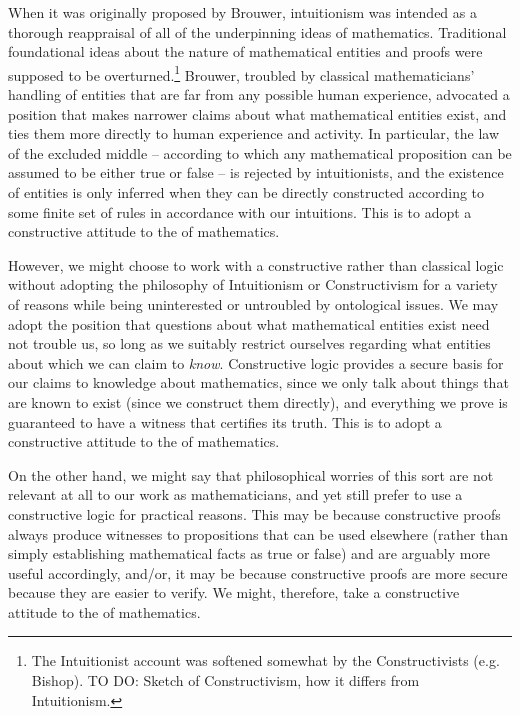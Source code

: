 When it was originally proposed by Brouwer, intuitionism was intended as a thorough reappraisal of all of the underpinning ideas of mathematics. Traditional foundational ideas about the nature of mathematical entities and proofs were supposed to be overturned.\footnote{
The Intuitionist account was softened somewhat by the Constructivists (e.g. Bishop).
TO DO: Sketch of Constructivism, how it differs from Intuitionism.
}
Brouwer, troubled by classical mathematicians' handling of entities that are far from any possible human experience,  advocated a position that makes narrower claims about what mathematical entities exist, and ties them more directly to human experience and activity. In particular, the law of the excluded middle -- according to which any mathematical proposition can be assumed to be either true or false -- is rejected by intuitionists, and the existence of entities is only inferred when they can be directly constructed according to some finite set of rules in accordance with our intuitions. This is to adopt a constructive attitude to the  of mathematics.

However, we might choose to work with a constructive rather than classical logic without adopting the philosophy of Intuitionism or Constructivism for a variety of reasons while being uninterested or untroubled by ontological issues. We may adopt the position that questions about what mathematical entities exist need not trouble us, so long as we suitably restrict ourselves regarding what entities about which we can claim to \emph{know}. Constructive logic provides a secure basis for our claims to knowledge about mathematics, since we only talk about things that are known to exist (since we construct them directly), and everything we prove is guaranteed to have a witness that certifies its truth. This is to adopt a constructive attitude to the  of mathematics.

On the other hand, we might say that philosophical worries of this sort are not relevant at all to our work as mathematicians, 
and yet still prefer to use a constructive logic for practical reasons. 
This may be because constructive proofs always produce witnesses to propositions that can be used elsewhere (rather than simply establishing mathematical facts as true or false) and are arguably more useful accordingly, and/or, it may be because constructive proofs are more secure because they are easier to verify. We might, therefore, take a constructive attitude to the  of mathematics.

